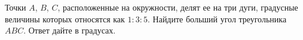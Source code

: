 \begin{ex}
	\begin{condition}
		Точки \( A \), \( B \), \( C \), расположенные на окружности, делят ее на три дуги, градусные величины которых относятся как \( 1:3:5 \). Найдите больший угол треугольника \( ABC \). Ответ дайте в градусах.
	\end{condition}
\end{ex}